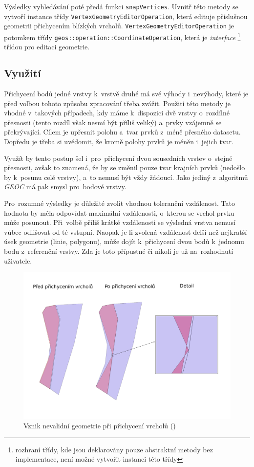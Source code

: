 Výsledky vyhledávání poté předá funkci \texttt{snap\-Vertices}. Uvnitř této
metody se vytvoří instance  třídy \texttt{Vertex\-Geometry\-Editor\-Operation},
která edituje příslušnou geometrii přichycením blízkých vrcholů.
\texttt{Vertex\-Geometry\-Editor\-Operation} je potomkem třídy 
\texttt{geos::\-operation::\-Coordinate\-Operation}, která je \textit{inter\-face}
\footnote{rozhraní třídy, kde jsou deklarovány pouze abstraktní metody bez
implementace, není možné vytvořit instanci této třídy} třídou pro editaci 
geometrie.


\subsection{Využití}
\label{vs-vyuziti}

Přichycení bodů jedné vrstvy k~vrstvě druhé má své výhody i~nevýhody, které 
je před volbou tohoto způsobu zpracování třeba zvážit. Použití této metody 
je vhodné v~takových případech, kdy máme k~dispozici dvě vrstvy o~rozdílné 
přesnosti (tento rozdíl však nesmí být příliš veliký) a~prvky vzájemně se 
překrývající. Cílem je upřesnit polohu a~tvar prvků z~méně přesného datasetu. 
Dopředu je třeba si uvědomit, že kromě polohy prvků je měněn i~jejich tvar.

Využít by tento postup šel i~pro~přichycení dvou sousedních vrstev o~stejné 
přesnosti, avšak to znamená, že by se změnil pouze tvar krajních prvků 
(nedošlo by k~posunu celé vrstvy), a~to nemusí být vždy žádoucí. Jako jediný
z~algoritmů \textit{GEOC} má pak smysl pro~bodové vrstvy.

Pro~rozumné výsledky je důležité zvolit vhodnou toleranční vzdálenost. Tato 
hodnota by měla odpovídat maximální vzdálenosti, o~kterou se vrchol prvku 
může posunout. Při~volbě příliš krátké vzdálenosti se výsledná vrstva nemusí 
vůbec odlišovat od té vstupní. Naopak \mbox{je-li} zvolená vzdálenost delší 
než nejkratší úsek geometrie (linie, polygonu), může dojít k~přichycení dvou 
bodů k~jednomu bodu z~referenční vrstvy. Zda je toto přípustné či nikoli je 
už na~rozhodnutí uživatele.

\label{vsinvalid}
  \begin{figure}[hbt]
    \centering
      \includegraphics[width=350pt]{./pictures/vs-invalid.pdf}
      \caption{Vznik nevalidní geometrie při přichycení vrcholů ()}
      \label{fig:vs-nevalidni}
  \end{figure} 

